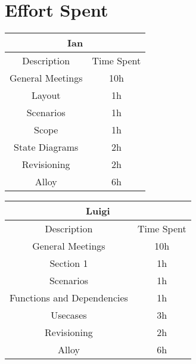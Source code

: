 \section{Effort Spent}\label{sec:effort}
\begin{center}
\begin{tabular}{ c|c } 
    \hline
    \multicolumn{2}{c}{Ian} \\
    \hline
    Description & Time Spent \\
    \hline
    General Meetings & 10h \\
    Layout & 1h \\
    Scenarios & 1h \\
    Scope & 1h \\
    State Diagrams & 2h \\
    Revisioning & 2h \\
    Alloy & 6h \\
    \hline
\end{tabular}
\end{center}


\begin{center}
\begin{tabular}{ c|c } 
    \hline
    \multicolumn{2}{c}{Luigi} \\
    \hline
    Description & Time Spent \\
    \hline
    General Meetings & 10h \\
    Section 1 & 1h \\
    Scenarios & 1h \\
    Functions and Dependencies & 1h \\
    Usecases & 3h \\
    Revisioning & 2h \\
    Alloy & 6h \\
    \hline
\end{tabular}
\end{center}